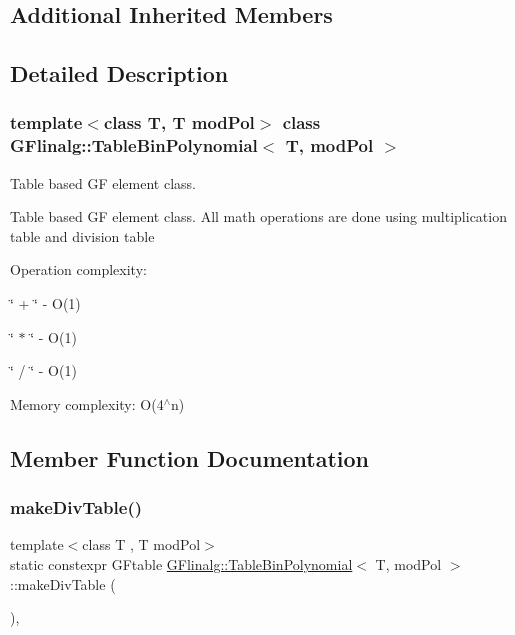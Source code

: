 \subsection*{Additional Inherited Members}


\subsection{Detailed Description}
\subsubsection*{template$<$class T, T mod\+Pol$>$\newline
class G\+Flinalg\+::\+Table\+Bin\+Polynomial$<$ T, mod\+Pol $>$}

Table based GF element class. 

Table based GF element class. All math operations are done using multiplication table and division table

Operation complexity\+:
\begin{DoxyItemize}
\item \char`\"{} + \char`\"{} -\/ O(1)
\item \char`\"{} $\ast$ \char`\"{} -\/ O(1)
\item \char`\"{} / \char`\"{} -\/ O(1)
\end{DoxyItemize}

Memory complexity\+: O(4$^\wedge$n) 

\subsection{Member Function Documentation}
\mbox{\label{class_g_flinalg_1_1_table_bin_polynomial_a96e01a69fa438eb178e50cccba002787}} 
\subsubsection{\texorpdfstring{makeDivTable()}{makeDivTable()}}
{\footnotesize\ttfamily template$<$class T , T mod\+Pol$>$ \\
static constexpr G\+Ftable \mbox{\hyperlink{class_g_flinalg_1_1_table_bin_polynomial}{G\+Flinalg\+::\+Table\+Bin\+Polynomial}}$<$ T, mod\+Pol $>$\+::make\+Div\+Table (\begin{DoxyParamCaption}{ }\end{DoxyParamCaption})\hspace{0.3cm}{\ttfamily [inline]}, {\ttfamily [static]}}

